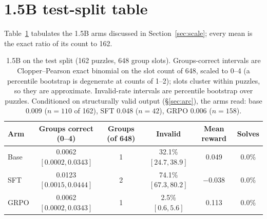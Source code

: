 \documentclass{article}
\begin{document}
\section{1.5B test-split table}
\label{app:small}

Table~\ref{tab:small} tabulates the 1.5B arms discussed in
Section~\ref{sec:scale}; every mean is the exact ratio of its count to 162.

\begin{table}[h]
\centering
\caption{1.5B on the test split (162 puzzles, 648 group slots).
Groups-correct intervals are Clopper--Pearson exact binomial on the slot
count of 648, scaled to 0--4 (a percentile bootstrap is degenerate at counts
of 1--2); slots cluster within puzzles, so they are approximate.
Invalid-rate intervals are percentile bootstrap over puzzles. Conditioned on
structurally valid output (\S\ref{sec:arc}), the arms read: base 0.009
($n=110$ of 162), SFT 0.048 ($n=42$), GRPO 0.006 ($n=158$).}
\label{tab:small}
\small
\setlength{\tabcolsep}{4pt}
\begin{tabular}{lccccc}
\toprule
Arm & Groups correct (0--4) & Groups (of 648) & Invalid & Mean reward & Solves \\
\midrule
Base & 0.0062 $[0.0002, 0.0343]$ & 1 & 32.1\% $[24.7, 38.9]$ & 0.049 & 0.0\% \\
SFT  & 0.0123 $[0.0015, 0.0444]$ & 2 & 74.1\% $[67.3, 80.2]$ & $-0.038$ & 0.0\% \\
GRPO & 0.0062 $[0.0002, 0.0343]$ & 1 & 2.5\% $[0.6, 5.6]$ & 0.113 & 0.0\% \\
\bottomrule
\end{tabular}
\end{table}
\end{document}
